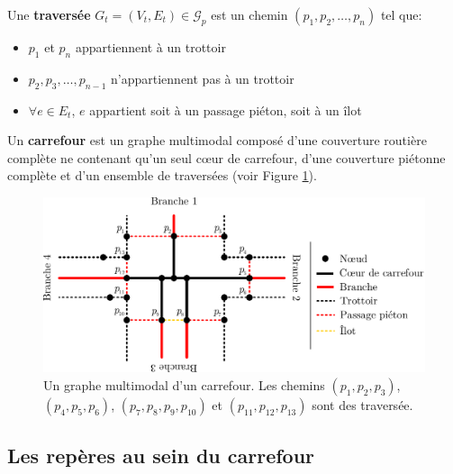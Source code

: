 \begin{definition}
    Une \textbf{traversée} $G_{t} = (V_{t}, E_{t}) \in \mathcal{G}_p$ est un chemin $(p_1, p_2,\dots, p_n)$ tel que:

    \begin{itemize}
        \item $p_1$ et $p_n$ appartiennent à un trottoir
        \item $p_2, p_3, \dots, p_{n-1}$ n'appartiennent pas à un trottoir
        \item $\forall e \in E_t$, $e$ appartient soit à un passage piéton, soit à un îlot
    \end{itemize}
\end{definition}

\begin{definition}
    Un \textbf{carrefour} est un graphe multimodal composé d'une couverture routière complète ne contenant qu'un seul cœur de carrefour, d'une couverture piétonne complète et d'un ensemble de traversées (voir Figure \ref{fig:mod_ex_graphe_carrefour}).
\end{definition}

\begin{figure}[ht]
    \centering
    \includegraphics[width=\textwidth]{images/modelisation/graphe/graphe_multimodal.pdf}
    \caption[Graphe multimodal d'un carrefour]{Un graphe multimodal d'un carrefour. Les chemins $(p_1, p_2, p_3)$, $(p_4, p_5, p_6)$, $(p_7, p_8, p_9, p_{10})$ et $(p_{11}, p_{12}, p_{13})$ sont des traversée.}
    \label{fig:mod_ex_graphe_carrefour}
\end{figure}

\subsection{Les repères au sein du carrefour}

\label{sec:mod_repere_carrefour}

